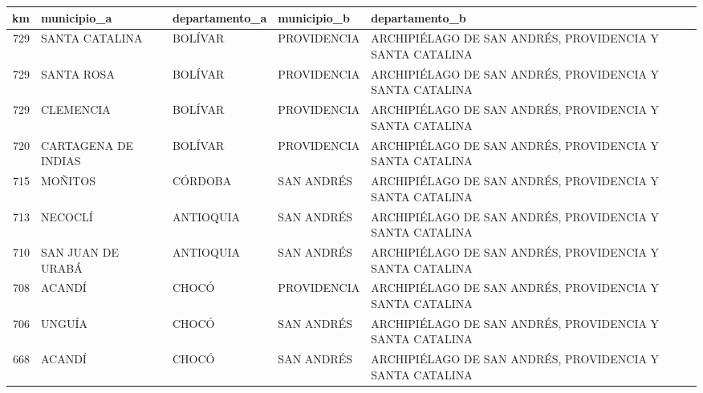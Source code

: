 \begin{tabular}{rllll}
\toprule
km & municipio\_a & departamento\_a & municipio\_b & departamento\_b \\
\midrule
729 & SANTA CATALINA & BOLÍVAR & PROVIDENCIA & ARCHIPIÉLAGO DE SAN ANDRÉS, PROVIDENCIA Y SANTA CATALINA \\
729 & SANTA ROSA & BOLÍVAR & PROVIDENCIA & ARCHIPIÉLAGO DE SAN ANDRÉS, PROVIDENCIA Y SANTA CATALINA \\
729 & CLEMENCIA & BOLÍVAR & PROVIDENCIA & ARCHIPIÉLAGO DE SAN ANDRÉS, PROVIDENCIA Y SANTA CATALINA \\
720 & CARTAGENA DE INDIAS & BOLÍVAR & PROVIDENCIA & ARCHIPIÉLAGO DE SAN ANDRÉS, PROVIDENCIA Y SANTA CATALINA \\
715 & MOÑITOS & CÓRDOBA & SAN ANDRÉS & ARCHIPIÉLAGO DE SAN ANDRÉS, PROVIDENCIA Y SANTA CATALINA \\
713 & NECOCLÍ & ANTIOQUIA & SAN ANDRÉS & ARCHIPIÉLAGO DE SAN ANDRÉS, PROVIDENCIA Y SANTA CATALINA \\
710 & SAN JUAN DE URABÁ & ANTIOQUIA & SAN ANDRÉS & ARCHIPIÉLAGO DE SAN ANDRÉS, PROVIDENCIA Y SANTA CATALINA \\
708 & ACANDÍ & CHOCÓ & PROVIDENCIA & ARCHIPIÉLAGO DE SAN ANDRÉS, PROVIDENCIA Y SANTA CATALINA \\
706 & UNGUÍA & CHOCÓ & SAN ANDRÉS & ARCHIPIÉLAGO DE SAN ANDRÉS, PROVIDENCIA Y SANTA CATALINA \\
668 & ACANDÍ & CHOCÓ & SAN ANDRÉS & ARCHIPIÉLAGO DE SAN ANDRÉS, PROVIDENCIA Y SANTA CATALINA \\
\bottomrule
\end{tabular}
